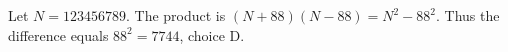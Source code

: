 Let $N=123456789$. The product is $(N+88)(N-88)=N^2-88^2$. Thus the difference equals $88^2=\boxed{7744}$, choice D.
